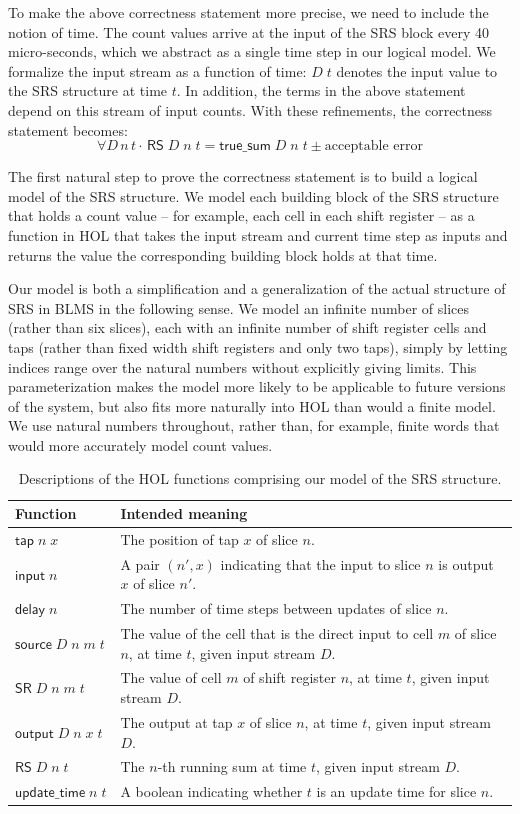 \documentclass{llncs}
\begin{document}
To make the above correctness statement more precise, we need to include the notion of time.
The count values arrive at the input of the SRS block every 40 micro-seconds, which we abstract as a single time step in our logical model.
We formalize the input stream as a function of time: $D\;t$ denotes the input value to the SRS structure at time $t$.
In addition, the terms in the above statement depend on this stream of input counts.
With these refinements, the correctness statement becomes: \[\forall{D\,n\,t} \cdot \,\mathsf{RS}\;D\;n\;t = \mathsf{true\_sum}\;D\;n\;t\pm\text{acceptable error}\]

The first natural step to prove the correctness statement is to build a logical model of the SRS structure.
We model each building block of the SRS structure that holds a count value -- for example, each cell in each shift register -- as a function in HOL that takes the input stream and current time step as inputs and returns the value the corresponding building block holds at that time.

Our model is both a simplification and a generalization of the actual structure of SRS in BLMS in the following sense.
We model an infinite number of slices (rather than six slices), each with an infinite number of shift register cells and taps (rather than fixed width shift registers and only two taps), simply by letting indices range over the natural numbers without explicitly giving limits.
This parameterization makes the model more likely to be applicable to future versions of the system, but also fits more naturally into HOL than would a finite model.
We use natural numbers throughout, rather than, for example, finite words that would more accurately model count values.

\begin{table}[t]
\caption{
Descriptions of the HOL functions comprising our model of the SRS structure.
\label{tab:descriptions}
}
\begin{tabular}{lp{}}
Function&Intended meaning\\
\hline
\(\mathsf{tap}\;n\;x\)&The position of tap $x$ of slice $n$.\\
\(\mathsf{input}\;n\)&A pair $(n',x)$ indicating that the input to slice $n$ is output $x$ of slice $n'$.\\
\(\mathsf{delay}\;n\)&The number of time steps between updates of slice $n$.\\
\(\mathsf{source}\;D\;n\;m\;t\)&The value of the cell that is the direct input to cell $m$ of slice $n$, at time $t$, given input stream $D$.\\
\(\mathsf{SR}\;D\;n\;m\;t\)&The value of cell $m$ of shift register $n$, at time $t$, given input stream $D$.\\
\(\mathsf{output}\;D\;n\;x\;t\)&The output at tap $x$ of slice $n$, at time $t$, given input stream $D$.\\
\(\mathsf{RS}\;D\;n\;t\)&The $n$-th running sum at time $t$, given input stream $D$.\\
\(\mathsf{update\_time}\;n\;t\)&A boolean indicating whether $t$ is an update time for slice $n$.
\end{tabular}
\end{table}
\end{document}
